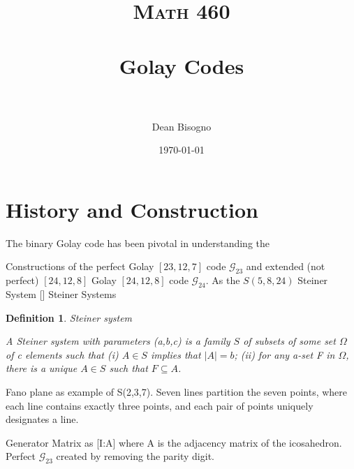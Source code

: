 \documentclass[paper=a4, fontsize=11pt]{scrartcl} %
\title{	
\normalfont \normalsize 
\textsc{Math 460} \\ [25pt] %
\horrule{0.5pt} \\[0.4cm] %
\huge Golay Codes\\ %
\horrule{2pt} \\[0.5cm] %
}
\author{Dean Bisogno} %
\date{\normalsize\today} %
\numberwithin{equation}{section} %
\numberwithin{figure}{section} %
\numberwithin{table}{section} %
\newtheorem{defn}{Definition}
\begin{document}
\maketitle %

\section{History and Construction}

The binary Golay code has been pivotal in understanding the 
\begin{outline}[enumerate]
   \1 Constructions of the perfect Golay $[23,12,7]$ code $\mathcal{G}_{23}$ and extended (not perfect) $[24,12,8]$ Golay $[24,12,8]$ code $\mathcal{G}_{24}$.
       \2 As the $S(5,8,24)$ Steiner System [\cite{griess}]
         \3 Steiner Systems
           \begin{defn}{Steiner system}

            A Steiner system with parameters (a,b,c) is a family $S$ of subsets of some set $\Omega$ of c elements such that (i) $A \in S$ implies that $|A| = b$; (ii) for any a-set \textit{F} in $\Omega$, there is a unique $A \in S$ such that $\textit{F} \subseteq A$.
           \end{defn}
         \3 Fano plane as example of S(2,3,7). Seven lines partition the seven points, where each line contains exactly three points, and each pair of points uniquely designates a line.


      \2 Generator Matrix as [I:A] where A is the adjacency matrix of the icosahedron.
      \2 Perfect $\mathcal{G}_{23}$ created by removing the parity digit.
\end{outline}
\end{document}
